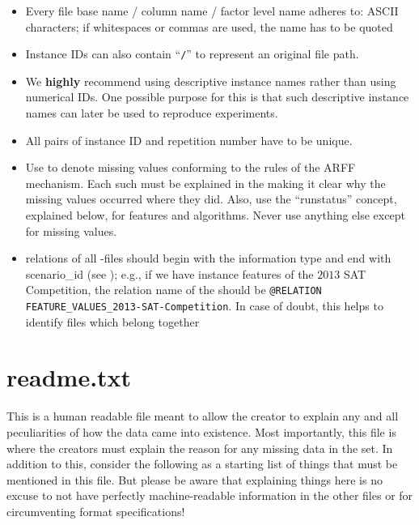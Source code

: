 \documentclass[]{elsarticle}
\begin{document}
\begin{itemize}
  	\item Every file base name / column name / factor level name adheres to: ASCII characters; if whitespaces or 
		commas are used, the name has to be quoted
	\item Instance IDs can also contain ``\texttt{/}'' to represent an original file path.
	\item We \textbf{highly} recommend using descriptive instance names rather than using numerical IDs. One 
		possible purpose for this is that such descriptive instance names can later be used to reproduce experiments.
	\item All pairs of instance ID and repetition number have to be unique.
  	\item Use \qm to denote missing values conforming to the rules of the ARFF mechanism. Each such \qm must be
		explained in the  making it clear why the missing values occurred where they did. Also, 
		use the \enquote{runstatus} concept, explained below, for features and algorithms. Never use anything else
		except \qm for missing values. 
    	\item relations of all -files should begin with the information type and end with scenario\_id 
		(see );  e.g., if we have instance features of the $2013$ SAT Competition, the 
		relation name of the  should be 
		\texttt{@RELATION FEATURE\_VALUES\_2013-SAT-Competition}. In case of doubt, this helps to identify 
		files which belong together
\end{itemize}
  
  
\section{readme.txt}

This is a human readable file meant to allow the creator to explain any and all peculiarities of how the data came 
into existence. Most importantly, this file is where the creators must explain the reason for any missing data in the
set. In addition to this, consider the following as a starting list of things that must be mentioned in this file. But please 
be aware that explaining things here is no excuse to not have perfectly machine-readable information in the other 
files or for circumventing format specifications!
\end{document}
